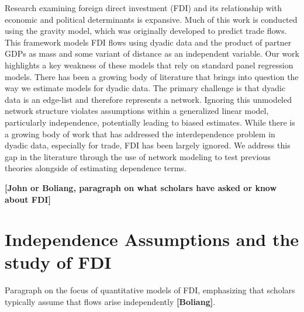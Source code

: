 \documentclass{article}
\begin{document}
Research examining foreign direct investment (FDI) and its relationship with economic and political determinants is expansive. Much of this work is conducted using the gravity model, which was originally developed to predict trade flows. This framework models FDI flows using dyadic data and the product of partner GDPs as mass and some variant of distance as an independent variable. Our work highlights a key weakness of these models that rely on standard panel regression models. There has been a growing body of literature that brings into question the way we estimate models for dyadic data. The primary challenge is that dyadic data is an edge-list and therefore represents a network. Ignoring this unmodeled network structure violates assumptions within a generalized linear model, particularly independence, potentially leading to biased estimates. While there is a growing body of work that has addressed the interdependence problem in dyadic data, especially for trade, FDI has been largely ignored. We address this gap in the literature through the use of network modeling to test previous theories alongside of estimating dependence terms.


{\bf [John or Boliang, paragraph on what scholars have asked or know about FDI]}



\section{Independence Assumptions and the study of FDI}

Paragraph on the focus of quantitative models of FDI, emphasizing that scholars typically assume that flows arise independently {\bf [Boliang]}.
\end{document}
